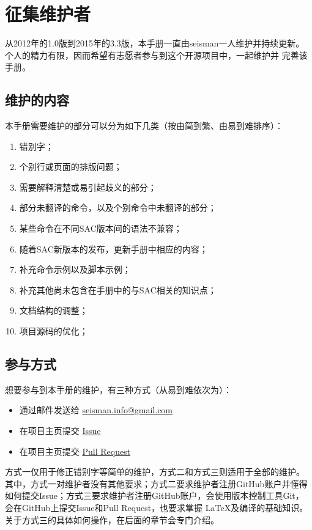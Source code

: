 \section{征集维护者}
从2012年的1.0版到2015年的3.3版，本手册一直由seisman一人维护并持续更新。
个人的精力有限，因而希望有志愿者参与到这个开源项目中，一起维护并
完善该手册。

\subsection{维护的内容}
本手册需要维护的部分可以分为如下几类（按由简到繁、由易到难排序）：
\begin{enumerate}
\item 错别字；
\item 个别行或页面的排版问题；
\item 需要解释清楚或易引起歧义的部分；
\item 部分未翻译的命令，以及个别命令中未翻译的部分；
\item 某些命令在不同SAC版本间的语法不兼容；
\item 随着SAC新版本的发布，更新手册中相应的内容；
\item 补充命令示例以及脚本示例；
\item 补充其他尚未包含在手册中的与SAC相关的知识点；
\item 文档结构的调整；
\item 项目源码的优化；
\end{enumerate}

\subsection{参与方式}
想要参与到本手册的维护，有三种方式（从易到难依次为）：
\begin{itemize}
\item 通过邮件发送给 \url{seisman.info@gmail.com}
\item 在项目主页提交 \href{https://github.com/seisman/SAC_Docs_zh/issues}{Issue}
\item 在项目主页提交 \href{https://github.com/seisman/SAC_Docs_zh/pulls}{Pull Request}
\end{itemize}
方式一仅用于修正错别字等简单的维护，方式二和方式三则适用于全部的维护。
其中，方式一对维护者没有其他要求；方式二要求维护者注册GitHub账户并懂得
如何提交Issue；方式三要求维护者注册GitHub账户，会使用版本控制工具Git，
会在GitHub上提交Issue和Pull Request，也要求掌握 \LaTeX 及编译的基础知识。
关于方式三的具体如何操作，在后面的章节会专门介绍。

